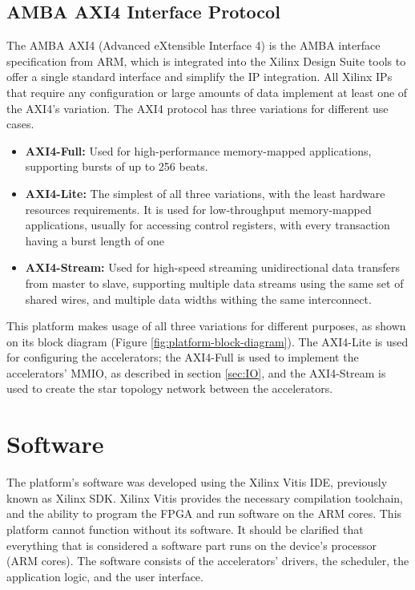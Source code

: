 \subsection{AMBA AXI4 Interface Protocol}
\label{sec:AMBA-AXI4-Interface-Protocol}
The AMBA AXI4 (Advanced eXtensible Interface 4) \cite{UG1037-Vivado-Design-Suite-AXI-Reference-Guide} is the AMBA interface specification from ARM, which is integrated into the Xilinx Design Suite tools to offer a single standard interface and simplify the IP integration. All Xilinx IPs that require any configuration or large amounts of data implement at least one of the AXI4's variation. The AXI4 protocol has three variations for different use cases.
\begin{itemize}
	\item \textbf{AXI4-Full:} Used for high-performance memory-mapped applications, supporting bursts of up to 256 beats.
	\item \textbf{AXI4-Lite:} The simplest of all three variations, with the least hardware resources requirements. It is used for low-throughput memory-mapped applications, usually for accessing control registers, with every transaction having a burst length of one
	\item \textbf{AXI4-Stream:} Used for high-speed streaming unidirectional data transfers from master to slave, supporting multiple data streams using the same set of shared wires, and multiple data widths withing the same interconnect.
\end{itemize}

This platform makes usage of all three variations for different purposes, as shown on its block diagram (Figure \ref{fig:platform-block-diagram}). The AXI4-Lite is used for configuring the accelerators; the AXI4-Full is used to implement the accelerators' MMIO, as described in section \ref{sec:IO}, and the AXI4-Stream is used to create the star topology network between the accelerators.

\section{Software}
The platform's software was developed using the Xilinx Vitis IDE, previously known as Xilinx SDK. Xilinx Vitis provides the necessary compilation toolchain, and the ability to program the FPGA and run software on the ARM cores. This platform cannot function without its software. It should be clarified that everything that is considered a software part runs on the device's processor (ARM cores). The software consists of the accelerators' drivers, the scheduler, the application logic, and the user interface.


